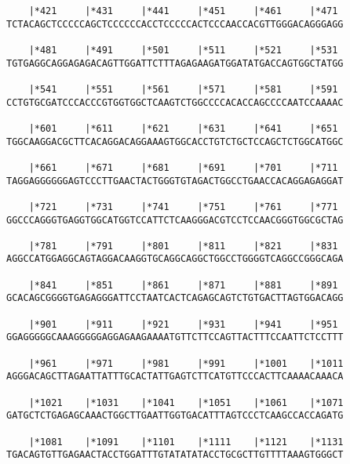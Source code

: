 \documentclass{article}
\begin{document}
\begin{Verbatim}
    |*421     |*431     |*441     |*451     |*461     |*471 
TCTACAGCTCCCCCAGCTCCCCCCACCTCCCCCACTCCCAACCACGTTGGGACAGGGAGG
                                                            
    |*481     |*491     |*501     |*511     |*521     |*531 
TGTGAGGCAGGAGAGACAGTTGGATTCTTTAGAGAAGATGGATATGACCAGTGGCTATGG
                                                            
    |*541     |*551     |*561     |*571     |*581     |*591 
CCTGTGCGATCCCACCCGTGGTGGCTCAAGTCTGGCCCCACACCAGCCCCAATCCAAAAC
                                                            
    |*601     |*611     |*621     |*631     |*641     |*651 
TGGCAAGGACGCTTCACAGGACAGGAAAGTGGCACCTGTCTGCTCCAGCTCTGGCATGGC
                                                            
    |*661     |*671     |*681     |*691     |*701     |*711 
TAGGAGGGGGGAGTCCCTTGAACTACTGGGTGTAGACTGGCCTGAACCACAGGAGAGGAT
                                                            
    |*721     |*731     |*741     |*751     |*761     |*771 
GGCCCAGGGTGAGGTGGCATGGTCCATTCTCAAGGGACGTCCTCCAACGGGTGGCGCTAG
                                                            
    |*781     |*791     |*801     |*811     |*821     |*831 
AGGCCATGGAGGCAGTAGGACAAGGTGCAGGCAGGCTGGCCTGGGGTCAGGCCGGGCAGA
                                                            
    |*841     |*851     |*861     |*871     |*881     |*891 
GCACAGCGGGGTGAGAGGGATTCCTAATCACTCAGAGCAGTCTGTGACTTAGTGGACAGG
                                                            
    |*901     |*911     |*921     |*931     |*941     |*951 
GGAGGGGGCAAAGGGGGAGGAGAAGAAAATGTTCTTCCAGTTACTTTCCAATTCTCCTTT
                                                            
    |*961     |*971     |*981     |*991     |*1001    |*1011
AGGGACAGCTTAGAATTATTTGCACTATTGAGTCTTCATGTTCCCACTTCAAAACAAACA
                                                            
    |*1021    |*1031    |*1041    |*1051    |*1061    |*1071
GATGCTCTGAGAGCAAACTGGCTTGAATTGGTGACATTTAGTCCCTCAAGCCACCAGATG
                                                            
    |*1081    |*1091    |*1101    |*1111    |*1121    |*1131
TGACAGTGTTGAGAACTACCTGGATTTGTATATATACCTGCGCTTGTTTTAAAGTGGGCT
                                                            

\end{Verbatim}
\end{document}
